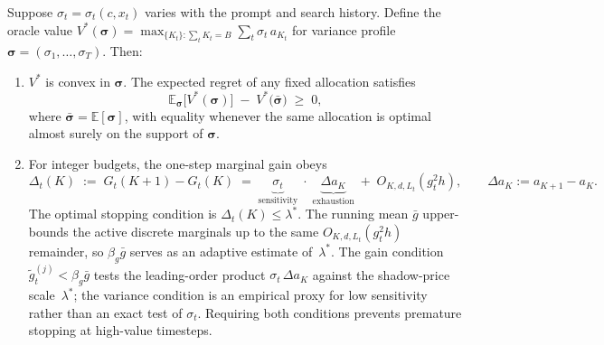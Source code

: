 \begin{proposition}
\label{prop:online}
Suppose $\sigma_t = \sigma_t(c, x_t)$ varies with the prompt and search
history.
Define the oracle value
$V^*(\boldsymbol{\sigma})=\max_{\{K_t\}:\sum_t K_t=B}
\sum_t\sigma_t\,a_{K_t}$
for variance profile $\boldsymbol{\sigma}=(\sigma_1,\dots,\sigma_T)$.
Then:
\begin{enumerate}
\item[\textbf{(i)}]
  $V^*$ is convex in $\boldsymbol{\sigma}$.
  The expected regret of any fixed allocation satisfies
  \begin{equation}
    \mathbb{E}_{\boldsymbol{\sigma}}\!\bigl[V^*(\boldsymbol{\sigma})\bigr]
    \;-\; V^*\!\bigl(\bar{\boldsymbol{\sigma}}\bigr) \;\ge\; 0,
    \label{eq:jensen-gap}
  \end{equation}
  where $\bar{\boldsymbol{\sigma}}=\mathbb{E}[\boldsymbol{\sigma}]$,
  with equality whenever the same allocation is optimal almost surely on
  the support of $\boldsymbol{\sigma}$.
\item[\textbf{(ii)}]
  For integer budgets, the one-step marginal gain obeys
  \begin{equation}
    \Delta_t(K)
    \;:=\;
    G_t(K{+}1)-G_t(K)
    \;=\;
    \underbrace{\sigma_t}_{\text{sensitivity}}
    \;\cdot\; \underbrace{\Delta a_K}_{\text{exhaustion}}
    \;+\; O_{K,d,L_t}(g_t^2 h),
    \qquad
    \Delta a_K:=a_{K+1}-a_K .
    \label{eq:marginal-decomp}
  \end{equation}
  The optimal stopping condition is $\Delta_t(K)\le\lambda^*$.
  The running mean $\bar{g}$ upper-bounds the active discrete marginals
  up to the same $O_{K,d,L_t}(g_t^2 h)$ remainder, so
  $\beta_g\bar{g}$ serves as an adaptive estimate of~$\lambda^*$.
  The gain condition $\widetilde{g}_t^{(j)}<\beta_g\bar{g}$ tests the
  leading-order product $\sigma_t\,\Delta a_K$ against the
  shadow-price scale~$\lambda^*$; the
  variance condition is an empirical proxy for low sensitivity rather
  than an exact test of $\sigma_t$.
  Requiring both conditions prevents premature stopping at
  high-value timesteps.
\end{enumerate}
\end{proposition}

